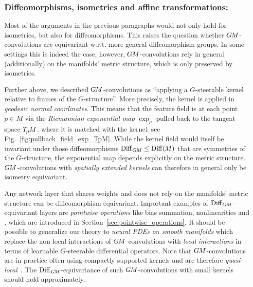 \subsubsection{Diffeomorphisms, isometries and affine transformations:}
\label{sec:visual_intro_diffeo_equiv}

Most of the arguments in the previous paragraphs would not only hold for isometries, but also for diffeomorphisms.
This raises the question whether $G\mkern-1.4muM$-convolutions are equivariant w.r.t. more general diffeomorphism groups.
In some settings this is indeed the case, however, $G\mkern-1.4muM$-convolutions rely in general (additionally) on the manifolds' metric structure, which is only preserved by isometries.


Further above, we described $G\mkern-1.4muM$-convolutions as ``applying a $G$-steerable kernel relative to frames of the $G$-structure''.
More precisely, the kernel is applied in \emph{geodesic normal coordinates}.
This means that the feature field is at each point $p\in M$ via the \emph{Riemannian exponential map} $\exp_p$ pulled back to the tangent space $T_{\mkern-1.5mu p}\mkern-.5muM$, where it is matched with the kernel; see Fig.~\ref{fig:pullback_field_exp_TpM}.
While the kernel field would itself be invariant under those diffeomorphisms $\operatorname{Diff}_{G\mkern-1.4muM}\leq\operatorname{Diff}(\mkern-1.5mu M \mkern-.5mu)$ that are symmetries of the $G$-structure, the exponential map depends explicitly on the metric structure.
$G\mkern-1.4muM$-convolutions with \emph{spatially extended kernels} can therefore in general only be isometry equivariant.


Any network layer that shares weights and does not rely on the manifolds' metric structure can be diffeomorphism equivariant.
Important examples of $\operatorname{Diff}_{G\mkern-1.4muM}$-equivariant layers are \emph{pointwise operations} like bias summation, nonlinearities and \onexones, which are introduced in Section~\ref{sec:pointwise_operations}.
It should be possible to generalize our theory to \emph{neural PDEs on smooth manifolds} which replace the non-local interactions of $G\mkern-1.4muM$-convolutions with \emph{local interactions} in terms of learnable $G$-steerable differential operators.
Note that $G\mkern-1.4muM$-convolutions are in practice often using compactly supported kernels and are therefore \emph{quasi-local}~\cite{tomboulis2015nonlocal}.
The $\operatorname{Diff}_{G\mkern-1.4muM}$-equivariance of such $G\mkern-1.4muM$-convolutions with small kernels should hold approximately.


